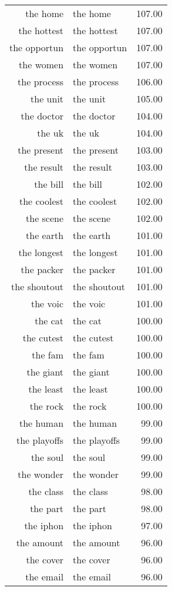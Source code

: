 \begin{table}[ht]
\begin{tabular}{rlr}
  the home & the home & 107.00 \\ 
  the hottest & the hottest & 107.00 \\ 
  the opportun & the opportun & 107.00 \\ 
  the women & the women & 107.00 \\ 
  the process & the process & 106.00 \\ 
  the unit & the unit & 105.00 \\ 
  the doctor & the doctor & 104.00 \\ 
  the uk & the uk & 104.00 \\ 
  the present & the present & 103.00 \\ 
  the result & the result & 103.00 \\ 
  the bill & the bill & 102.00 \\ 
  the coolest & the coolest & 102.00 \\ 
  the scene & the scene & 102.00 \\ 
  the earth & the earth & 101.00 \\ 
  the longest & the longest & 101.00 \\ 
  the packer & the packer & 101.00 \\ 
  the shoutout & the shoutout & 101.00 \\ 
  the voic & the voic & 101.00 \\ 
  the cat & the cat & 100.00 \\ 
  the cutest & the cutest & 100.00 \\ 
  the fam & the fam & 100.00 \\ 
  the giant & the giant & 100.00 \\ 
  the least & the least & 100.00 \\ 
  the rock & the rock & 100.00 \\ 
  the human & the human & 99.00 \\ 
  the playoffs & the playoffs & 99.00 \\ 
  the soul & the soul & 99.00 \\ 
  the wonder & the wonder & 99.00 \\ 
  the class & the class & 98.00 \\ 
  the part & the part & 98.00 \\ 
  the iphon & the iphon & 97.00 \\ 
  the amount & the amount & 96.00 \\ 
  the cover & the cover & 96.00 \\ 
  the email & the email & 96.00 \\ 

\end{tabular}
\end{table}
